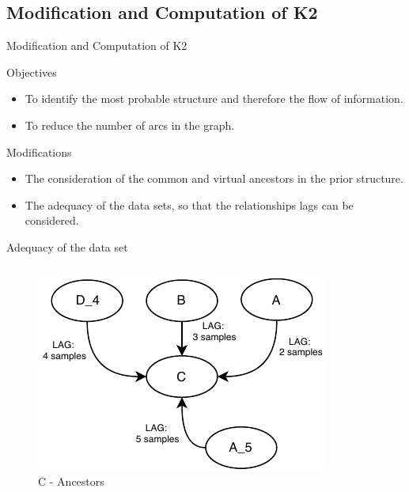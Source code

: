 \subsection{Modification and Computation of K2}
\begin{frame}{Modification and Computation of K2}

\begin{block}{Objectives}
\begin{itemize}
     \item To identify the most probable structure and therefore the flow of information.
    \item To reduce the number of arcs in the graph.
\end{itemize}
\end{block}


\begin{block}{Modifications}
\begin{itemize}
    \item The consideration of the common and virtual ancestors in the prior structure.
    \item The adequacy of the data sets, so that the relationships lags can be considered.
\end{itemize}
\end{block}
\end{frame}

\begin{frame}{Adequacy of the data set}
    \begin{columns}
        \column{\textwidth}
            \begin{figure}
                    \includegraphics{figuras/cVirt.pdf}
                    \caption{C - Ancestors}
            \end{figure}
        
    \end{columns}
    
    
\end{frame}

